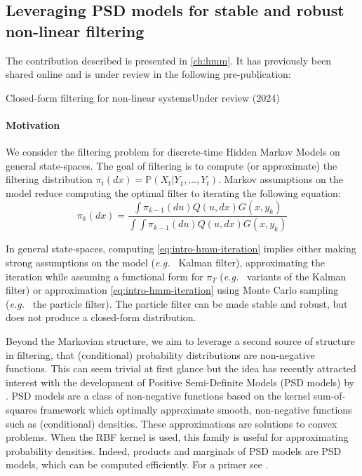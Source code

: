 \subsection{Leveraging PSD models for stable and robust non-linear filtering}
\begin{mdframed}
The contribution described is presented in \cref{ch:hmm}.
\noindent It has previously been shared online and is under review in the following pre-publication:
\begin{mdframed}
{Closed-form filtering for non-linear systems}{Under review (2024)}
\end{mdframed}
\end{mdframed}

\paragraph{Motivation}
We consider the filtering problem for discrete-time Hidden Markov Models on general state-spaces. The goal of filtering is to compute (or approximate) the filtering distribution $\pi_t(dx) = \mathbb P(X_t\vert Y_1, \ldots, Y_{t})$. Markov assumptions on the model reduce computing the optimal filter to iterating the following equation:
\begin{equation}\label{eq:intro-hmm-iteration}
\pi_k(dx) = \frac{\int \pi_{k-1}(du)Q(u, dx)G(x, y_k)}{\int \int \pi_{k-1}(du)Q(u, dx)G(x, y_k)}
\end{equation}

In general state-spaces, computing \cref{eq:intro-hmm-iteration} implies either making strong assumptions on the model (\emph{e.g.\ } Kalman filter), approximating the iteration while assuming a functional form for $\pi_T$ (\emph{e.g.\ } variants of the Kalman filter) or approximation \cref{eq:intro-hmm-iteration} using Monte Carlo sampling (\emph{e.g.\ } the particle filter). The particle filter can be made stable and robust, but does not produce a closed-form distribution.

Beyond the Markovian structure, we aim to leverage a second source of structure in filtering, that (conditional) probability distributions are non-negative functions. This can seem trivial at first glance but the idea has recently attracted interest with the development of Positive Semi-Definite Models (PSD models) by \citet{ulysse-non-negative}. PSD models are a class of non-negative functions based on the kernel sum-of-squares framework which optimally approximate smooth, non-negative functions such as (conditional) densities. These approximations are solutions to convex problems. When the RBF kernel is used, this family is useful for approximating probability densities. Indeed, products and marginals of PSD models are PSD models, which can be computed efficiently. For a primer see \citep{rudi2021psd,sampling-ulysse}.



